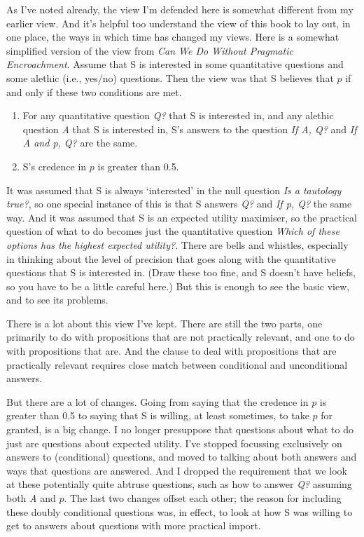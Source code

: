 \documentclass[11pt,]{book}
\providecommand{\tightlist}{%
  \setlength{\itemsep}{0pt}\setlength{\parskip}{0pt}}
\begin{document}
As I've noted already, the view I'm defended here is somewhat different from my earlier view. And it's helpful too understand the view of this book to lay out, in one place, the ways in which time has changed my views. Here is a somewhat simplified version of the view from \emph{Can We Do Without Pragmatic Encroachment}. Assume that S is interested in some quantitative questions and some alethic (i.e., yes/no) questions. Then the view was that S believes that \(p\) if and only if these two conditions are met.

\begin{enumerate}
\def\labelenumi{\arabic{enumi}.}
\tightlist
\item
  For any quantitative question \emph{Q?} that S is interested in, and any alethic question \emph{A} that S is interested in, S's answers to the question \emph{If A, Q?} and \emph{If A and p, Q?} are the same.
\item
  S's credence in \(p\) is greater than 0.5.
\end{enumerate}

It was assumed that S is always `interested' in the null question \emph{Is a tautology true?}, so one special instance of this is that S answers \emph{Q?} and \emph{If p, Q?} the same way. And it was assumed that S is an expected utility maximiser, so the practical question of what to do becomes just the quantitative question \emph{Which of these options has the highest expected utility?}. There are bells and whistles, especially in thinking about the level of precision that goes along with the quantitative questions that S is interested in. (Draw these too fine, and S doesn't have beliefs, so you have to be a little careful here.) But this is enough to see the basic view, and to see its problems.

There is a lot about this view I've kept. There are still the two parts, one primarily to do with propositions that are not practically relevant, and one to do with propositions that are. And the clause to deal with propositions that are practically relevant requires close match between conditional and unconditional answers.

But there are a lot of changes. Going from saying that the credence in \(p\) is greater than 0.5 to saying that S is willing, at least sometimes, to take \(p\) for granted, is a big change. I no longer presuppose that questions about what to do just are questions about expected utility. I've stopped focussing exclusively on answers to (conditional) questions, and moved to talking about both answers and ways that questions are answered. And I dropped the requirement that we look at these potentially quite abtruse questions, such as how to answer \emph{Q?} assuming both \emph{A} and \(p\). The last two changes offset each other; the reason for including these doubly conditional questions was, in effect, to look at how S was willing to get to answers about questions with more practical import.
\end{document}
